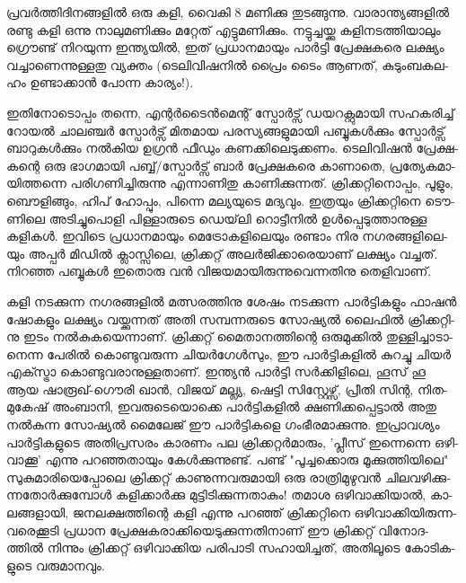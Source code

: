 
­പ്ര­വര്‍­ത്തി­ദി­ന­ങ്ങ­ളില്‍ ഒരു കളി, വൈ­കി 8 മണി­ക്കു തു­ട­ങ്ങു­ന്നു. വാ­രാ­ന്ത്യ­ങ്ങ­ളില്‍ രണ്ടു കളി ഒന്നു നാ­ലു­മ­ണി­ക്കും മറ്റേ­ത് 
എട്ടു­മ­ണി­ക്കും. നട്ടു­ച്ച­യ്ക്കു കളി­ന­ട­ത്തി­യാ­ലും ഗ്രൌ­ണ്ട് നി­റ­യു­ന്ന ഇന്ത്യ­യില്‍, ഇത് പ്ര­ധാ­ന­മാ­യും പാര്‍­ട്ടി പ്രേ­ക്ഷ­ക­രെ ലക്ഷ്യം 
വച്ചാ­ണെ­ന്നു­ള്ള­തു വ്യ­ക്തം (ടെ­ലി­വി­ഷ­നില്‍ പ്രൈം ടൈം ആണ­ത്, കു­ടും­ബ­ക­ല­ഹം ഉണ്ടാ­ക്കാന്‍ പോ­ന്ന കാ­ര്യം­!).

ഇ­തി­നോ­ടൊ­പ്പം തന്നെ, എന്റര്‍­ടൈന്‍­മെ­ന്റ് സ്പോര്‍­ട്സ് ഡയ­റ­ക്റ്റു­മാ­യി സഹ­ക­രി­ച്ച് റോ­യല്‍ ചാ­ല­ഞ്ചര്‍ സ്പോര്‍­ട്സ് 
മി­ത­മായ പര­സ്യ­ങ്ങ­ളു­മാ­യി പബ്ബു­കള്‍­ക്കും സ്പോര്‍­ട്സ് ബാ­റു­കള്‍­ക്കും നല്‍­കിയ ഉഗ്രന്‍ ഫീ­ഡും കണ­ക്കി­ലെ­ടു­ക്ക­ണം. 
ടെ­ലി­വി­ഷന്‍ പ്രേ­ക്ഷ­ക­ന്റെ ഒരു ഭാ­ഗ­മാ­യി പബ്ബ്/­സ്പോര്‍­ട്സ് ബാര്‍ പ്രേ­ക്ഷ­ക­രെ കാ­ണാ­തെ, പ്ര­ത്യേ­ക­മാ­യി­ത്ത­ന്നെ 
പരി­ഗ­ണി­ച്ചി­രു­ന്നു എന്നാ­ണി­തു കാ­ണി­ക്കു­ന്ന­ത്. ക്രി­ക്ക­റ്റി­നൊ­പ്പം, പൂ­ളും, ബൌ­ളി­ങ്ങും, ഹി­പ് ഹോ­പ്പും, പി­ന്നെ മല്യ­യു­ടെ മദ്യ­വും. 
ഇത്ര­യും ക്രി­ക്ക­റ്റി­നെ ടൌ­ണി­ലെ അടി­ച്ചു­പൊ­ളി പി­ള്ളാ­രു­ടെ ഡെ­യ്‌­ലി റൊ­ട്ടീ­നില്‍ ഉള്‍­പ്പെ­ടു­ത്താ­നു­ള്ള കളി­കള്‍. ഇവി­ടെ 
പ്ര­ധാ­ന­മാ­യും മെ­ട്രോ­ക­ളി­ലെ­യും രണ്ടാം നിര നഗ­ര­ങ്ങ­ളി­ലെ­യും അപ്പര്‍ മി­ഡില്‍ ക്ലാ­സ്സി­ലെ, ക്രി­ക്ക­റ്റ് അലര്‍­ജി­ക്കാ­രെ­യാ­ണ് 
ലക്ഷ്യം വച്ച­ത്. നി­റ­ഞ്ഞ പബ്ബു­കള്‍ ഇതൊ­രു വന്‍ വി­ജ­യ­മാ­യി­രു­ന്നു­വെ­ന്ന­തി­നു തെ­ളി­വാ­ണ്.


­ക­ളി നട­ക്കു­ന്ന നഗ­ര­ങ്ങ­ളില്‍ മത്സ­ര­ത്തി­നു ശേ­ഷം നട­ക്കു­ന്ന പാര്‍­ട്ടി­ക­ളും ഫാ­ഷന്‍ ഷോ­ക­ളും ലക്ഷ്യം വയ്ക്കു­ന്ന­ത് അതി 
സമ്പ­ന്ന­രു­ടെ സോ­ഷ്യല്‍ ലൈ­ഫില്‍ ക്രി­ക്ക­റ്റി­നു ഇടം നല്‍­കു­ക­യെ­ന്നാ­ണ്. ക്രി­ക്ക­റ്റ് മൈ­താ­ന­ത്തി­ന്റെ ഒരു­മു­ക്കില്‍ 
തു­ള്ളി­ച്ചാ­ടാ­നെ­ന്ന പേ­രില്‍ കൊ­ണ്ടു­വ­രു­ന്ന ചി­യര്‍­ഗേള്‍­സും, ഈ പാര്‍­ട്ടി­ക­ളില്‍ കു­റ­ച്ചു ചി­യര്‍ എക്സ്ട്രാ കൊ­ണ്ടു­വ­രാ­നു­ള്ള­താ­ണ്. 
ഇന്ത്യന്‍ പാര്‍­ട്ടി സര്‍­ക്കി­ളി­ലെ, ഹൂ­സ് ഹൂ ആയ ഷാ­രൂ­ഖ്-ഗൌ­രി ഖാന്‍, വി­ജ­യ് മല്ല്യ, ഷെ­ട്ടി സി­സ്റ്റേ­ഴ്സ്, പ്രീ­തി സി­ന്റ, 
നിത-മു­കേ­ഷ് അം­ബാ­നി, ഇവ­രു­ടെ­യൊ­ക്കെ പാര്‍­ട്ടി­ക­ളില്‍ ക്ഷ­ണി­ക്ക­പ്പെ­ട്ടാല്‍ അതു നല്‍­കു­ന്ന സോ­ഷ്യല്‍ മൈ­ലേ­ജ് ഈ 
പാര്‍­ട്ടി­ക­ളെ ഗം­ഭീ­ര­മാ­ക്കു­ന്നു. ഇപ്രാ­വ­ശ്യം പാര്‍­ട്ടി­ക­ളു­ടെ അതി­പ്ര­സ­രം കാ­ര­ണം പല ക്രി­ക്ക­റ്റര്‍­മാ­രും, 'പ്ലീ­സ് ഇന്നെ­ന്നെ 
ഒഴി­വാ­ക്കൂ' എന്നു പറ­ഞ്ഞ­താ­യും കേള്‍­ക്കു­ന്നു­ണ്ട്. പണ്ട് "പൂ­ച്ച­ക്കൊ­രു മൂ­ക്കു­ത്തി­യി­ലെ" സു­കു­മാ­രി­യെ­പ്പോ­ലെ ക്രി­ക്ക­റ്റ് 
കാ­ണു­ന്ന­വ­രു­മാ­യി ഒരു രാ­ത്രി­മു­ഴു­വന്‍ ചി­ല­വ­ഴി­ക്കു­ന്ന­തോര്‍­ക്കു­മ്പോള്‍ കളി­ക്കാര്‍­ക്കു മു­ട്ടി­ടി­ക്കു­ന്ന­താ­കും! തമാശ ഒഴി­വാ­ക്കി­യാല്‍, 
കാ­ല­ങ്ങ­ളാ­യി, ജന­ല­ക്ഷ­ത്തി­ന്റെ കളി എന്നു പറ­ഞ്ഞ് ക്രി­ക്ക­റ്റി­നെ ഒഴി­വാ­ക്കി­യി­രു­ന്ന­വ­രെ­ക്കൂ­ടി പ്ര­ധാന 
പ്രേ­ക്ഷ­ക­രാ­ക്കി­യെ­ടു­ക്കു­ന്ന­തി­നാ­ണ് ഈ ക്രി­ക്ക­റ്റ് വി­നോ­ദ­ത്തില്‍ നി­ന്നും ക്രി­ക്ക­റ്റ് ഒഴി­വാ­ക്കിയ പരി­പാ­ടി സഹാ­യി­ച്ച­ത്, 
അതി­ലൂ­ടെ കോ­ടി­ക­ളു­ടെ വരു­മാ­ന­വും­.

